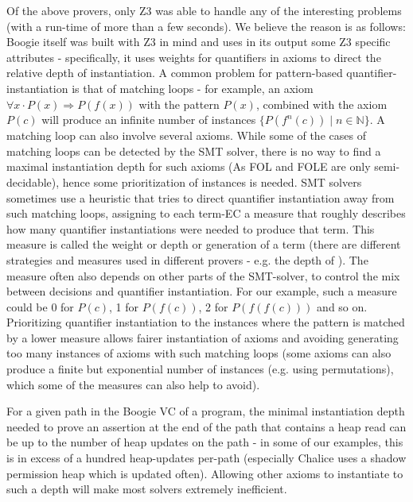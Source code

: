 Of the above provers, only Z3 was able to handle any of the interesting problems (with a run-time of more than a few seconds).
We believe the reason is as follows:
Boogie itself was built with Z3 in mind and uses in its output some Z3 specific attributes - specifically, it uses weights for quantifiers in axioms to direct the relative depth of instantiation.
A common problem for pattern-based quantifier-instantiation is that of matching loops - for example, an axiom 
$\forall x \cdot P(x) \Rightarrow P(f(x))$ with the pattern $P(x)$, combined with the axiom $P(c)$ will produce an infinite number of instances $\{P(f^n(c)) \mid n \in \mathbb{N}\}$. A matching loop can also involve several axioms. 
While some of the cases of matching loops can be detected by the SMT solver, there is no way to find a maximal instantiation depth for such axioms (As FOL and FOLE are only semi-decidable), hence some prioritization of instances is needed.
SMT solvers sometimes use a heuristic that tries to direct quantifier instantiation away from such matching loops, 
assigning to each term-EC a measure that roughly describes how many quantifier instantiations were needed to produce that term.
This measure is called the weight or depth or generation of a term (there are different strategies and measures used in different provers - e.g. the depth of \cite{DBLP:journals/jacm/DetlefsNS05}). The measure often also depends on other parts of the SMT-solver, to control the mix between decisions and quantifier instantiation. For our example, such a measure could be 0 for $P(c)$, 1 for $P(f(c))$, 2 for $P(f(f(c)))$ and so on. Prioritizing quantifier instantiation to the instances where the pattern is matched by a lower measure allows fairer instantiation of axioms and avoiding generating too many instances of axioms with such matching loops (some axioms can also produce a finite but exponential number of instances (e.g. using permutations), which some of the measures can also help to avoid).

For a given path in the Boogie VC of a program, the minimal instantiation depth needed to prove an assertion at the end of the path that contains a heap read can be up to the number of heap updates on the path - in some of our examples, this is in excess of a hundred heap-updates per-path (especially Chalice uses a shadow permission heap which is updated often). Allowing other axioms to instantiate to such a depth will make most solvers extremely inefficient. 

